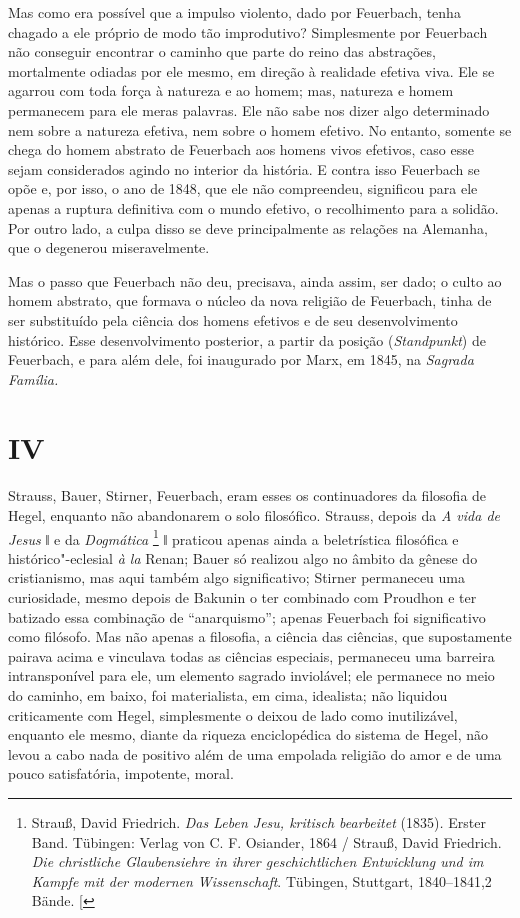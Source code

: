 Mas como era possível que a impulso violento, dado
por Feuerbach, tenha
chagado a ele próprio de modo tão improdutivo? Simplesmente por
Feuerbach não
conseguir encontrar o caminho que parte do reino das abstrações,
mortalmente odiadas por ele mesmo, em direção à realidade efetiva viva.
Ele se agarrou com toda força à natureza e ao homem; mas, natureza e
homem permanecem para ele meras palavras. Ele não sabe nos dizer algo
determinado nem sobre a natureza efetiva, nem sobre o homem efetivo. No
entanto, somente se chega do homem abstrato
de Feuerbach aos
homens vivos efetivos, caso esse sejam considerados agindo no interior
da história. E contra isso
Feuerbach se
opõe e, por isso, o ano de 1848, que ele não compreendeu, significou
para ele apenas a ruptura definitiva com o mundo efetivo, o recolhimento
para a solidão. Por outro lado, a culpa disso se deve principalmente as
relações na Alemanha, que o degenerou miseravelmente.

Mas o passo
que Feuerbach não
deu, precisava, ainda assim, ser dado; o culto ao homem abstrato, que
formava o núcleo da nova religião
de Feuerbach,
tinha de ser substituído pela ciência dos homens efetivos e de seu
desenvolvimento histórico. Esse desenvolvimento posterior, a partir da
posição (\emph{Standpunkt})
de Feuerbach,
e para além dele, foi inaugurado por Marx, em 1845, na \emph{Sagrada
Família.}

\pagebreak

\section{IV}

Strauss, Bauer, Stirner, Feuerbach,
eram esses os continuadores da filosofia
de Hegel,
enquanto não abandonarem o solo
filosófico. Strauss,
depois da \emph{A vida de Jesus }ǁ e
da \emph{Dogmática} \footnote{Strauß, David Friedrich. \emph{Das Leben Jesu, kritisch bearbeitet}
  (1835)\emph{.} Erster Band. Tübingen: Verlag von C. F. Osiander, 1864
  / Strauß, David Friedrich. \emph{Die christliche Glaubensiehre in
  ihrer geschichtlichen Entwicklung und im Kampfe mit der modernen
  Wissenschaft}. Tübingen, Stuttgart, 1840--1841,2 Bände. {[}\versal{N.\,T.}{]}} ǁ praticou
apenas ainda a beletrística filosófica e histórico"-eclesial \emph{à
la} Renan; Bauer só
realizou algo no âmbito da gênese do cristianismo, mas aqui também algo
significativo; Stirner permaneceu
uma curiosidade, mesmo depois de  Bakunin o ter combinado com Proudhon e
ter batizado essa combinação de ``anarquismo''; apenas
Feuerbach foi
significativo como filósofo. Mas não apenas a filosofia, a ciência das
ciências, que supostamente pairava acima e vinculava todas as ciências
especiais, permaneceu uma barreira intransponível para ele, um elemento
sagrado inviolável; ele permanece no meio do caminho, em baixo, foi
materialista, em cima, idealista; não liquidou criticamente
com Hegel,
simplesmente o deixou de lado como inutilizável, enquanto ele mesmo,
diante da riqueza enciclopédica do sistema
de Hegel,
não levou a cabo nada de positivo além de uma empolada religião do amor
e de uma pouco satisfatória, impotente, moral.


